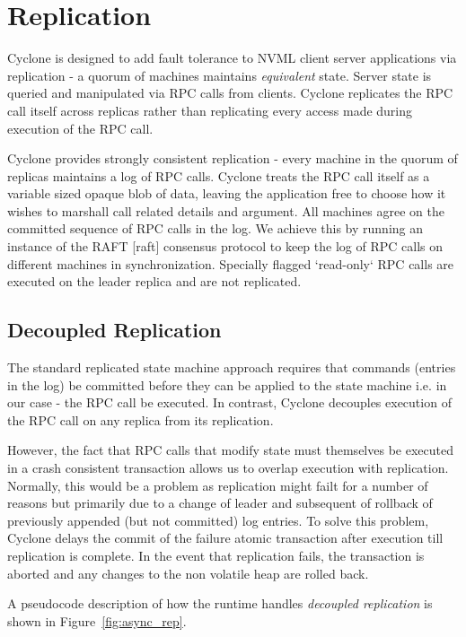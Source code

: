 \documentclass[letterpaper,twocolumn,10pt]{article}
\begin{document}
\section{Replication}
Cyclone is designed to add fault tolerance to NVML client server applications
via replication - a quorum of machines maintains \emph{equivalent} state. Server
state is queried and manipulated via RPC calls from clients. Cyclone replicates
the RPC call itself across replicas rather than replicating every access made
during execution of the RPC call.

Cyclone provides strongly consistent replication - every machine in the quorum
of replicas maintains a log of RPC calls. Cyclone treats the RPC call itself as
a variable sized opaque blob of data, leaving the application free to choose how
it wishes to marshall call related details and argument. All machines agree on
the committed sequence of RPC calls in the log. We achieve this by running an
instance of the RAFT [raft] consensus protocol to keep the log of RPC calls on
different machines in synchronization. Specially flagged `read-only` RPC calls
are executed on the leader replica and are not replicated.

\subsection{Decoupled Replication}
\label{sec:decouple}
The standard replicated state machine approach requires that commands (entries
in the log) be committed before they can be applied to the state machine i.e. in
our case - the RPC call be executed. In contrast, Cyclone decouples execution of
the RPC call on any replica from its replication.

However, the fact that RPC calls that modify state must themselves be executed
in a crash consistent transaction allows us to overlap execution with
replication. Normally, this would be a problem as replication might failt for a
number of reasons but primarily due to a change of leader and subsequent of
rollback of previously appended (but not committed) log entries. To solve this
problem, Cyclone delays the commit of the failure atomic transaction after
execution till replication is complete. In the event that replication fails, the
transaction is aborted and any changes to the non volatile heap are rolled back.

A pseudocode description of how the runtime handles \emph{decoupled replication}
is shown in Figure~\ref{fig:async_rep}.
\end{document}
